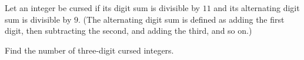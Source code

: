 Let an integer be cursed if its digit sum is divisible by $11$ and its alternating digit sum is divisible by $9$. (The alternating digit sum is defined as adding the first digit, then subtracting the second, and adding the third, and so on.)



Find the number of three-digit cursed integers.





